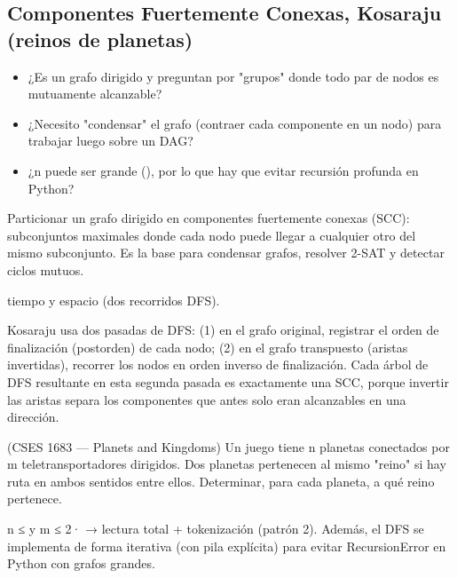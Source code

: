 \subsection{Componentes Fuertemente Conexas, Kosaraju (reinos de planetas)}
\label{alg:4-4}


\begin{itemize}
\item ¿Es un grafo dirigido y preguntan por "grupos" donde todo par de nodos es mutuamente alcanzable?
\item ¿Necesito "condensar" el grafo (contraer cada componente en un nodo) para trabajar luego sobre un DAG?
\item ¿n puede ser grande (\aprox{}), por lo que hay que evitar recursión profunda en Python?
\end{itemize}

 Particionar un grafo dirigido en componentes fuertemente conexas (SCC): subconjuntos maximales donde cada nodo puede llegar a cualquier otro del mismo subconjunto. Es la base para condensar grafos, resolver 2-SAT y detectar ciclos mutuos.

  tiempo y espacio (dos recorridos DFS).

 Kosaraju usa dos pasadas de DFS: (1) en el grafo original, registrar el orden de finalización (postorden) de cada nodo; (2) en el grafo transpuesto (aristas invertidas), recorrer los nodos en orden inverso de finalización. Cada árbol de DFS resultante en esta segunda pasada es exactamente una SCC, porque invertir las aristas separa los componentes que antes solo eran alcanzables en una dirección.~\cite{sharir1981}


(CSES 1683 — Planets and Kingdoms) Un juego tiene n planetas conectados por m teletransportadores dirigidos. Dos planetas pertenecen al mismo "reino" si hay ruta en ambos sentidos entre ellos. Determinar, para cada planeta, a qué reino pertenece.

 n ≤  y m ≤ 2· → lectura total + tokenización (patrón 2). Además, el DFS se implementa de forma iterativa (con pila explícita) para evitar RecursionError en Python con grafos grandes.


